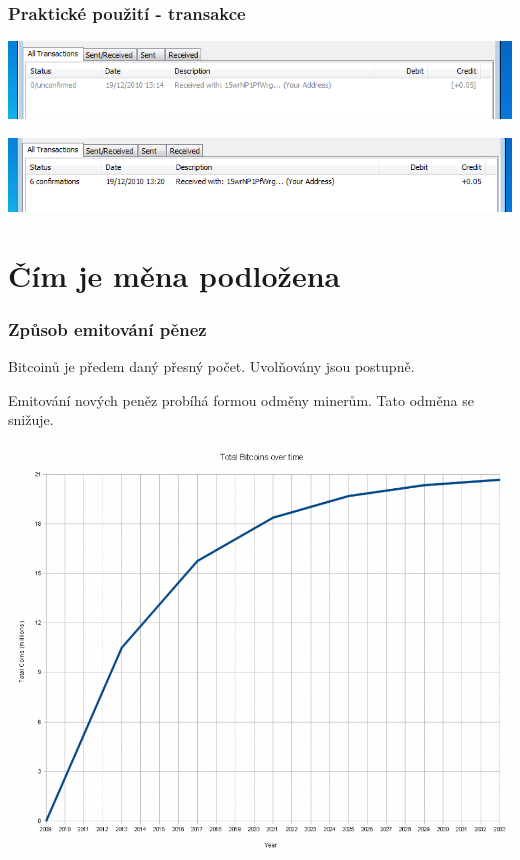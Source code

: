 \documentclass[xetex]{beamer}
\begin{document}
\begin{frame}
\frametitle{Praktické použití - transakce}
	\includegraphics[scale=0.6]{images/btc-recv.png}

	\medskip        

	\includegraphics[scale=0.6]{images/btc-recv-confirm.png}
\end{frame}

\section{Čím je měna podložena}

\begin{frame}
        \frametitle{Způsob emitování pěnez}
        Bitcoinů je předem daný přesný počet.
        Uvolňovány jsou postupně.

        Emitování nových peněz probíhá formou odměny minerům. Tato odměna se snižuje.

        \smallskip

        \includegraphics[scale=0.20]{images/emitation.png}
\end{frame}
\end{document}
